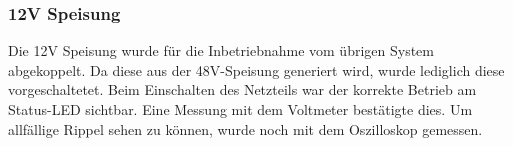 \subsubsection{12V Speisung}
\label{subsubsec:Inbetriebnahme_12V_Speisungen}

Die 12V Speisung wurde für die Inbetriebnahme vom übrigen System abgekoppelt. Da diese aus der 48V-Speisung generiert wird, wurde lediglich diese vorgeschaltetet. Beim Einschalten des Netzteils war der korrekte Betrieb am Status-LED sichtbar. Eine Messung mit dem Voltmeter bestätigte dies. Um allfällige Rippel sehen zu können, wurde noch mit dem Oszilloskop gemessen.

